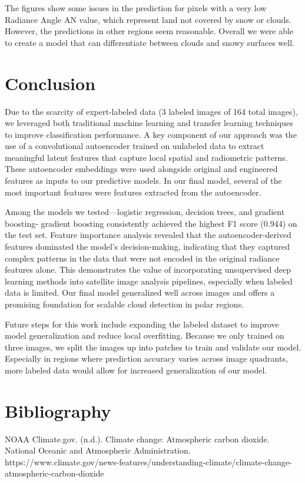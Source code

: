 \documentclass[11pt,letterpaper]{article}
\begin{document}
The figures show some issues in the prediction for pixels with a very low Radiance Angle AN value, which represent land not covered by snow or clouds. However, the predictions in other regions seem reasonable. Overall we were able to create a model that can differentiate between clouds and snowy surfaces well.

\section{Conclusion}
Due to the scarcity of expert-labeled data (3 labeled images of 164 total images), we leveraged both traditional machine learning and transfer learning techniques to improve classification performance. A key component of our approach was the use of a convolutional autoencoder trained on unlabeled data to extract meaningful latent features that capture local spatial and radiometric patterns. These autoencoder embeddings were used alongside original and engineered features as inputs to our predictive models. In our final model, several of the most important features were features extracted from the autoencoder. 

Among the models we tested—logistic regression, decision trees, and gradient boosting- gradient boosting consistently achieved the highest F1 score (0.944) on the test set. Feature importance analysis revealed that the autoencoder-derived features dominated the model's decision-making, indicating that they captured complex patterns in the data that were not encoded in the original radiance features alone. This demonstrates the value of incorporating unsupervised deep learning methods into satellite image analysis pipelines, especially when labeled data is limited. Our final model generalized well across images and offers a promising foundation for scalable cloud detection in polar regions.

Future steps for this work include expanding the labeled dataset to improve model generalization and reduce local overfitting. Because we only trained on three images, we split the images up into patches to train and validate our model. Especially in regions where prediction accuracy varies across image quadrants, more labeled data would allow for increased generalization of our model.

\section{Bibliography}
NOAA Climate.gov. (n.d.). Climate change: Atmospheric carbon dioxide. National Oceanic and Atmospheric Administration. https://www.climate.gov/news-features/understanding-climate/climate-change-atmospheric-carbon-dioxide
\end{document}
